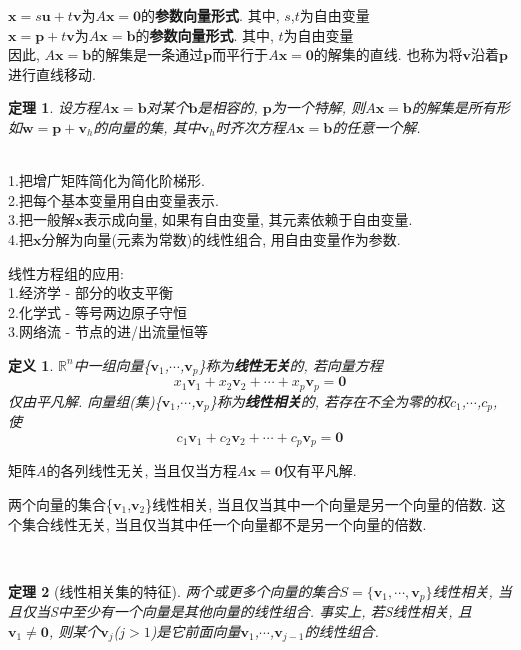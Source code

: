 \documentclass[UTF8,fontset=ubuntu]{ctexart}
\theoremstyle{nonumberplain}
\newtheorem{definition}{定义}
\theoremstyle{break}
\newtheorem{theorem}{定理}
\theoremstyle{empty}
\begin{document}
$\bm{x}=s\bm{u}+t\bm{v}$为$A\bm{x}=\bm{0}$的\textbf{参数向量形式}. 其中, $s$,$t$为自由变量\\
$\bm{x}=\bm{p}+t\bm{v}$为$A\bm{x}=\bm{b}$的\textbf{参数向量形式}. 其中, $t$为自由变量\\
因此, $A\bm{x}=\bm{b}$的解集是一条通过$\bm{p}$而平行于$A\bm{x}=\bm{0}$的解集的直线. 也称为将$\bm{v}$沿着$\bm{p}$进行直线移动.\\[2ex]
\begin{theorem}
设方程$A\bm{x}=\bm{b}$对某个$\bm{b}$是相容的, $\bm{p}$为一个特解, 则$A\bm{x}=\bm{b}$的解集是所有形如$\bm{w}=\bm{p}+\bm{v}_h$的向量的集, 其中$\bm{v}_h$时齐次方程$A\bm{x}=\bm{b}$的任意一个解.
\end{theorem}
\begin{law}\ \\
1.把增广矩阵简化为简化阶梯形.\\
2.把每个基本变量用自由变量表示.\\
3.把一般解$\bm{x}$表示成向量, 如果有自由变量, 其元素依赖于自由变量.\\
4.把$\bm{x}$分解为向量(元素为常数)的线性组合, 用自由变量作为参数.
\end{law}
线性方程组的应用:\\
1.经济学 - 部分的收支平衡\\
2.化学式 - 等号两边原子守恒\\
3.网络流 - 节点的进/出流量恒等\\
\begin{definition}
$\mathbb{R}^n$中一组向量\{$\bm{v}_1$,$\cdots$,$\bm{v}_p$\}称为\textbf{线性无关}的, 若向量方程
\[x_1\bm{v}_1+x_2\bm{v}_2+\cdots+x_p\bm{v}_p=\bm{0}\]
仅由平凡解. 向量组(集)\{$\bm{v}_1$,$\cdots$,$\bm{v}_p$\}称为\textbf{线性相关}的, 若存在不全为零的权$c_1$,$\cdots$,$c_p$, 使
\[c_1\bm{v}_1+c_2\bm{v}_2+\cdots+c_p\bm{v}_p=\bm{0}\]
\end{definition}
\begin{law}
矩阵$A$的各列线性无关, 当且仅当方程$A\bm{x}=\bm{0}$仅有平凡解.
\end{law}
\begin{law}
两个向量的集合\{$\bm{v}_1$,$\bm{v}_2$\}线性相关, 当且仅当其中一个向量是另一个向量的倍数. 这个集合线性无关, 当且仅当其中任一个向量都不是另一个向量的倍数.
\end{law}\ \\
\begin{theorem}[线性相关集的特征]
两个或更多个向量的集合$S=\{\bm{v}_1,\cdots,\bm{v}_p\}$线性相关, 当且仅当S中至少有一个向量是其他向量的线性组合. 事实上, 若S线性相关, 且$\bm{v}_1\neq\bm{0}$, 则某个$\bm{v}_j$($j>1$)是它前面向量$\bm{v}_1$,$\cdots$,$\bm{v}_{j-1}$的线性组合.\\[2ex]
\end{theorem}
\end{document}
